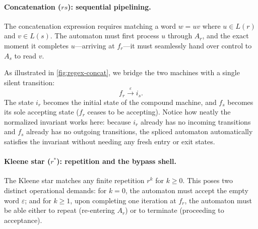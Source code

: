 \paragraph{Concatenation ($rs$): sequential pipelining.}
The concatenation expression requires matching a word $w = uv$ where $u \in L(r)$ and $v \in L(s)$. The automaton must first process $u$ through $A_r$, and the exact moment it completes $u$---arriving at $f_r$---it must seamlessly hand over control to $A_s$ to read $v$.

As illustrated in \cref{fig:regex-concat}, we bridge the two machines with a single silent transition:
\[
  f_r \xrightarrow{\varepsilon} i_s.
\]
The state $i_r$ becomes the initial state of the compound machine, and $f_s$ becomes its sole accepting state ($f_r$ ceases to be accepting). Notice how neatly the normalized invariant works here: because $i_r$ already has no incoming transitions and $f_s$ already has no outgoing transitions, the spliced automaton automatically satisfies the invariant without needing any fresh entry or exit states.

\begin{center}
\begin{minipage}{\linewidth}
\centering
{}
\label{fig:regex-concat}
\end{minipage}
\end{center}

\paragraph{Kleene star ($r^*$): repetition and the bypass shell.}
The Kleene star matches any finite repetition $r^k$ for $k \ge 0$. This poses two distinct operational demands: for $k = 0$, the automaton must accept the empty word $\varepsilon$; and for $k \ge 1$, upon completing one iteration at $f_r$, the automaton must be able either to repeat (re-entering $A_r$) or to terminate (proceeding to acceptance).

